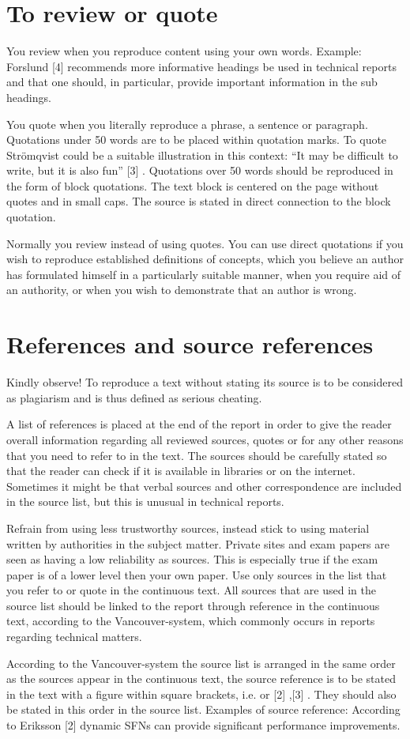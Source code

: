 \section{To review or quote}
You review when you reproduce content using your own words.
Example: Forslund [4] recommends more informative headings be used
in technical reports and that one should, in particular, provide
important information in the sub headings.

You quote when you literally reproduce a phrase, a sentence or
paragraph. Quotations under 50 words are to be placed within
quotation marks. To quote Strömqvist could be a suitable illustration in
this context: “It may be difficult to write, but it is also fun” [3] .
Quotations over 50 words should be reproduced in the form of block
quotations. The text block is centered on the page without quotes and in
small caps. The source is stated in direct connection to the block
quotation.

Normally you review instead of using quotes. You can use direct
quotations if you wish to reproduce established definitions of concepts,
which you believe an author has formulated himself in a particularly
suitable manner, when you require aid of an authority, or when you
wish to demonstrate that an author is wrong. 

\section{References and source references}
Kindly observe! To reproduce a text without stating its source is to be
considered as plagiarism and is thus defined as serious cheating.

A list of references is placed at the end of the report in order to give the
reader overall information regarding all reviewed sources, quotes or for
any other reasons that you need to refer to in the text. The sources
should be carefully stated so that the reader can check if it is available in
libraries or on the internet. Sometimes it might be that verbal sources
and other correspondence are included in the source list, but this is
unusual in technical reports. 

Refrain from using less trustworthy sources, instead stick to using
material written by authorities in the subject matter. Private sites and
exam papers are seen as having a low reliability as sources. This is
especially true if the exam paper is of a lower level then your own paper.
Use only sources in the list that you refer to or quote in the continuous
text. All sources that are used in the source list should be linked to the
report through reference in the continuous text, according to the
Vancouver-system, which commonly occurs in reports regarding technical
matters.

According to the Vancouver-system the source list is arranged in the
same order as the sources appear in the continuous text, the source
reference is to be stated in the text with a figure within square brackets,
i.e. \cite{latexcompanion} or [2] ,[3] . They should also be stated in this order in the source
list. Examples of source reference: According to Eriksson [2] dynamic
SFNs can provide significant performance improvements. 

